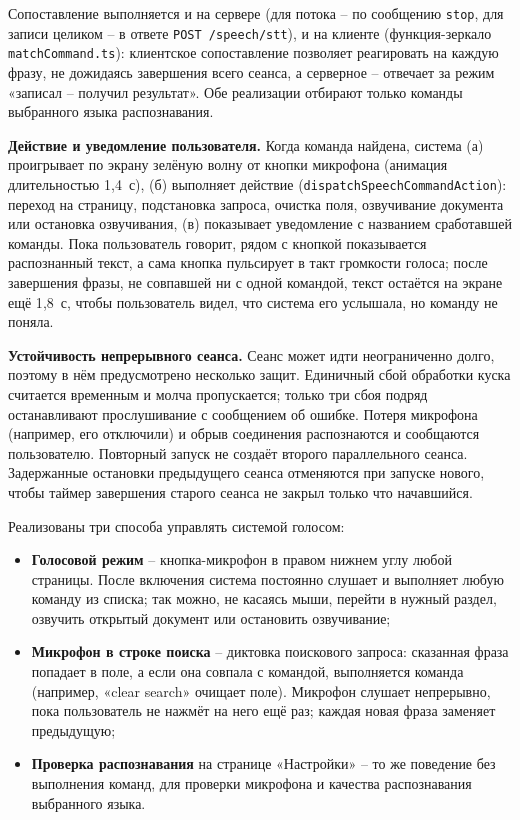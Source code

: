 
Сопоставление выполняется и на сервере (для потока -- по сообщению
\texttt{stop}, для записи целиком -- в ответе \texttt{POST /speech/stt}),
и на клиенте (функция-зеркало \texttt{matchCommand.ts}): клиентское
сопоставление позволяет реагировать на каждую фразу, не дожидаясь
завершения всего сеанса, а серверное -- отвечает за режим «записал --
получил результат». Обе реализации отбирают только команды выбранного
языка распознавания.

\textbf{Действие и уведомление пользователя.} Когда команда найдена,
система (а) проигрывает по экрану зелёную волну от кнопки микрофона
(анимация длительностью 1{,}4~с), (б) выполняет действие
(\texttt{dispatchSpeechCommandAction}): переход на страницу,
подстановка запроса, очистка поля, озвучивание документа или
остановка озвучивания, (в) показывает уведомление с названием
сработавшей команды. Пока пользователь говорит, рядом с кнопкой
показывается распознанный текст, а сама кнопка пульсирует в такт
громкости голоса; после завершения фразы, не совпавшей ни с одной
командой, текст остаётся на экране ещё 1{,}8~с, чтобы пользователь
видел, что система его услышала, но команду не поняла.

\textbf{Устойчивость непрерывного сеанса.} Сеанс может идти
неограниченно долго, поэтому в нём предусмотрено несколько защит.
Единичный сбой обработки куска считается временным и молча
пропускается; только три сбоя подряд останавливают прослушивание с
сообщением об ошибке. Потеря микрофона (например, его отключили) и
обрыв соединения распознаются и сообщаются пользователю. Повторный
запуск не создаёт второго параллельного сеанса. Задержанные
остановки предыдущего сеанса отменяются при запуске нового, чтобы
таймер завершения старого сеанса не закрыл только что начавшийся.


Реализованы три способа управлять системой голосом:
\begin{itemize}
  \item \textbf{Голосовой режим} -- кнопка-микрофон в правом нижнем
  углу любой страницы. После включения система постоянно слушает и
  выполняет любую команду из списка; так можно, не касаясь мыши,
  перейти в нужный раздел, озвучить открытый документ или остановить
  озвучивание;
  \item \textbf{Микрофон в строке поиска} -- диктовка поискового запроса:
  сказанная фраза попадает в поле, а если она совпала с командой,
  выполняется команда (например, «clear search» очищает поле).
  Микрофон слушает непрерывно, пока пользователь не нажмёт на него
  ещё раз; каждая новая фраза заменяет предыдущую;
  \item \textbf{Проверка распознавания} на странице «Настройки» -- то же
  поведение без выполнения команд, для проверки микрофона и качества
  распознавания выбранного языка.
\end{itemize}



